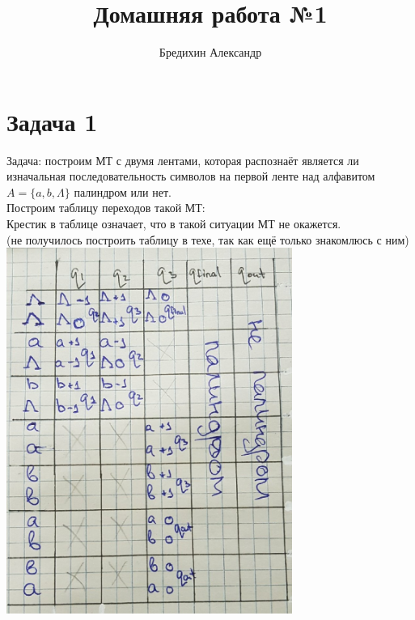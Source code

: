 \documentclass[a4paper,12pt]{article} %
\author{Бредихин Александр}
\title{Домашняя работа №1}
\begin{document}

\maketitle

\section*{Задача 1}
Задача: построим МТ с двумя лентами, которая распознаёт является ли изначальная последовательность символов на первой ленте над алфавитом $A = \lbrace a, b, \Lambda\rbrace$ палиндром или нет. \\
Построим таблицу переходов такой МТ:\\
Крестик в таблице означает, что в такой ситуации МТ не окажется. \\ [6pt]
(не получилось построить таблицу в техе, так как ещё только знакомлюсь с ним)\\

\includegraphics[width=0.7\textwidth]{tabl}
\end{document}

